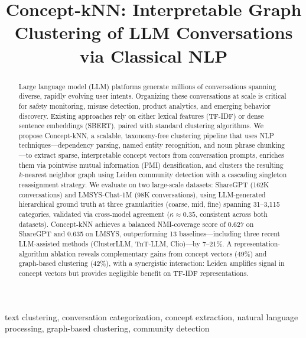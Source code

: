 \documentclass[conference]{IEEEtran}
\begin{document}
\title{Concept-kNN: Interpretable Graph Clustering of LLM Conversations via Classical NLP}

\author{
\and
{}
}

\maketitle

\begin{abstract}
Large language model (LLM) platforms generate millions of conversations spanning diverse, rapidly evolving user intents. Organizing these conversations at scale is critical for safety monitoring, misuse detection, product analytics, and emerging behavior discovery. Existing approaches rely on either lexical features (TF-IDF) or dense sentence embeddings (SBERT), paired with standard clustering algorithms. We propose Concept-kNN, a scalable, taxonomy-free clustering pipeline that uses NLP techniques---dependency parsing, named entity recognition, and noun phrase chunking---to extract sparse, interpretable concept vectors from conversation prompts, enriches them via pointwise mutual information (PMI) densification, and clusters the resulting $k$-nearest neighbor graph using Leiden community detection with a cascading singleton reassignment strategy. We evaluate on two large-scale datasets: ShareGPT (162K conversations) and LMSYS-Chat-1M (98K conversations), using LLM-generated hierarchical ground truth at three granularities (coarse, mid, fine) spanning 31--3,115 categories, validated via cross-model agreement ($\kappa \approx 0.35$, consistent across both datasets). Concept-kNN achieves a balanced NMI-coverage score of 0.627 on ShareGPT and 0.635 on LMSYS, outperforming 13 baselines---including three recent LLM-assisted methods (ClusterLLM, TnT-LLM, Clio)---by 7--21\%. A representation-algorithm ablation reveals complementary gains from concept vectors (49\%) and graph-based clustering (42\%), with a synergistic interaction: Leiden amplifies signal in concept vectors but provides negligible benefit on TF-IDF representations.
\end{abstract}

\begin{IEEEkeywords}
text clustering, conversation categorization, concept extraction, natural language processing, graph-based clustering, community detection
\end{IEEEkeywords}
\end{document}
